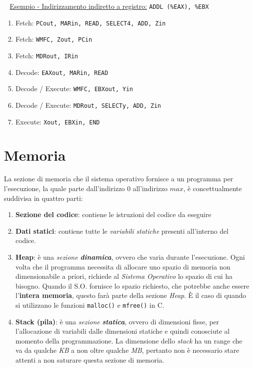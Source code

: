 \documentclass[a4paper,11pt,oneside]{book}
\begin{document}
~\newline
\underline{Esempio - Indirizzamento indiretto a registro:} \tabto{9cm} \texttt{ADDL (\%EAX), \%EBX}
\begin{enumerate}
    \item Fetch: \texttt{PCout, MARin, READ, SELECT4, ADD, Zin}
    \item Fetch: \texttt{WMFC, Zout, PCin}
    \item Fetch: \texttt{MDRout, IRin}
    \item Decode: \texttt{EAXout, MARin, READ}
    \item Decode / Execute: \texttt{WMFC, EBXout, Yin}
    \item Decode / Execute: \texttt{MDRout, SELECTy, ADD, Zin}
    \item Execute: \texttt{Xout, EBXin, END}
\end{enumerate}

\section{Memoria}
La sezione di memoria che il sistema operativo fornisce a un programma per l'esecuzione, la quale parte
dall'indirizzo $0$ all'indirizzo $max$, è concettualmente suddivisa in quattro parti:
\begin{enumerate}
    \item \textbf{Sezione del codice}: contiene le istruzioni del codice da eseguire
    \item \textbf{Dati statici}: contiene tutte le \emph{variabili statiche} presenti all'interno del codice. 
    \item \textbf{Heap}: è una \emph{sezione \textbf{dinamica}}, ovvero che varia durante l'esecuzione.
    Ogni volta che il programma necessita di allocare uno spazio di memoria non dimensionabile a priori, richiede al \emph{Sistema Operativo} lo spazio di cui
    ha bisogno. Quando il S.O. fornisce lo spazio richiesto, che potrebbe anche essere l'\textbf{intera memoria}, questo farà parte della sezione \emph{Heap}. È il caso di quando si utilizzano le funzioni \texttt{malloc()} e \texttt{mfree()} in C.
    \item \textbf{Stack (pila)}: è una \emph{sezione \textbf{statica}}, ovvero di dimensioni fisse, per l'allocazione di variabili dalle dimensioni statiche e
    quindi conosciute al momento della programmazione. La dimensione dello \emph{stack} ha un range che va da qualche \emph{KB} a non oltre qualche \emph{MB}, pertanto non 
    è necessario stare attenti a non saturare questa sezione di memoria.
\end{enumerate}
\end{document}

